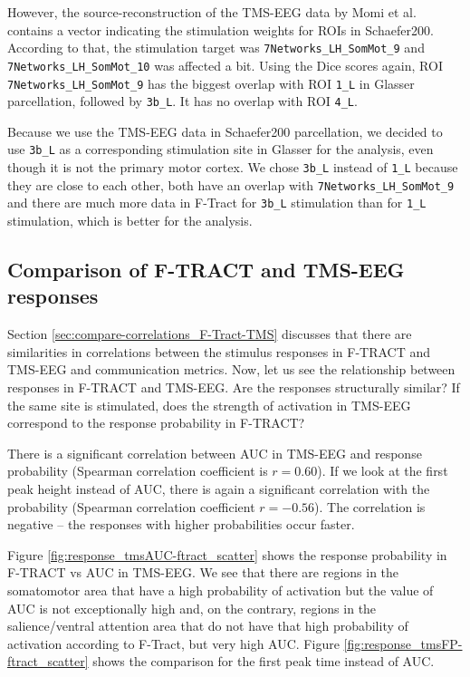 However, the source-reconstruction of the TMS-EEG data by Momi et al. \cite{momi_tms-evoked_2023} contains a vector indicating the stimulation weights for ROIs in Schaefer200. According to that, the stimulation target was \texttt{7Networks\_LH\_SomMot\_9} and \texttt{7Networks\_LH\_SomMot\_10} was affected a bit. Using the Dice scores again, ROI \texttt{7Networks\_LH\_SomMot\_9} has the biggest overlap with ROI \texttt{1\_L} in Glasser parcellation, followed by \texttt{3b\_L}. It has no overlap with ROI \texttt{4\_L}.

Because we use the TMS-EEG data in Schaefer200 parcellation, we decided to use \texttt{3b\_L} as a corresponding stimulation site in Glasser for the analysis, even though it is not the primary motor cortex. We chose \texttt{3b\_L} instead of \texttt{1\_L} because they are close to each other, both have an overlap with \texttt{7Networks\_LH\_SomMot\_9} and there are much more data in F-Tract for \texttt{3b\_L} stimulation than for \texttt{1\_L} stimulation, which is better for the analysis. 

\subsection{Comparison of F-TRACT and TMS-EEG responses}

Section \ref{sec:compare-correlations_F-Tract-TMS} discusses that there are similarities in correlations between the stimulus responses in F-TRACT and TMS-EEG and communication metrics. Now, let us see the relationship between responses in F-TRACT and TMS-EEG. Are the responses structurally similar? If the same site is stimulated, does the strength of activation in TMS-EEG correspond to the response probability in F-TRACT?

There is a significant correlation between AUC in TMS-EEG and response probability (Spearman correlation coefficient is $r=0.60$). If we look at the first peak height instead of AUC, there is again a significant correlation with the probability (Spearman correlation coefficient $r=-0.56$). The correlation is negative -- the responses with higher probabilities occur faster. 

Figure \ref{fig:response_tmsAUC-ftract_scatter} shows the response probability in F-TRACT vs AUC in TMS-EEG. We see that there are regions in the somatomotor area that have a high probability of activation but the value of AUC is not exceptionally high and, on the contrary, regions in the salience/ventral attention area that do not have that high probability of activation according to F-Tract, but very high AUC. Figure \ref{fig:response_tmsFP-ftract_scatter} shows the comparison for the first peak time instead of AUC. 

